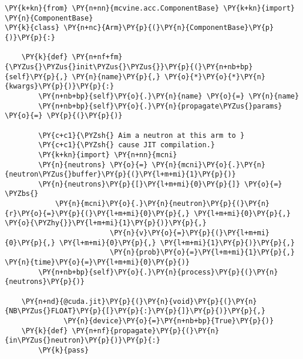 \begin{Verbatim}[commandchars=\\\{\}]
\PY{k+kn}{from} \PY{n+nn}{mcvine.acc.ComponentBase} \PY{k+kn}{import} \PY{n}{ComponentBase}
\PY{k}{class} \PY{n+nc}{Arm}\PY{p}{(}\PY{n}{ComponentBase}\PY{p}{)}\PY{p}{:}

    \PY{k}{def} \PY{n+nf+fm}{\PYZus{}\PYZus{}init\PYZus{}\PYZus{}}\PY{p}{(}\PY{n+nb+bp}{self}\PY{p}{,} \PY{n}{name}\PY{p}{,} \PY{o}{*}\PY{o}{*}\PY{n}{kwargs}\PY{p}{)}\PY{p}{:}
        \PY{n+nb+bp}{self}\PY{o}{.}\PY{n}{name} \PY{o}{=} \PY{n}{name}
        \PY{n+nb+bp}{self}\PY{o}{.}\PY{n}{propagate\PYZus{}params} \PY{o}{=} \PY{p}{(}\PY{p}{)}

        \PY{c+c1}{\PYZsh{} Aim a neutron at this arm to }
        \PY{c+c1}{\PYZsh{} cause JIT compilation.}
        \PY{k+kn}{import} \PY{n+nn}{mcni}
        \PY{n}{neutrons} \PY{o}{=} \PY{n}{mcni}\PY{o}{.}\PY{n}{neutron\PYZus{}buffer}\PY{p}{(}\PY{l+m+mi}{1}\PY{p}{)}
        \PY{n}{neutrons}\PY{p}{[}\PY{l+m+mi}{0}\PY{p}{]} \PY{o}{=} \PYZbs{}
            \PY{n}{mcni}\PY{o}{.}\PY{n}{neutron}\PY{p}{(}\PY{n}{r}\PY{o}{=}\PY{p}{(}\PY{l+m+mi}{0}\PY{p}{,} \PY{l+m+mi}{0}\PY{p}{,} \PY{o}{\PYZhy{}}\PY{l+m+mi}{1}\PY{p}{)}\PY{p}{,} 
                         \PY{n}{v}\PY{o}{=}\PY{p}{(}\PY{l+m+mi}{0}\PY{p}{,} \PY{l+m+mi}{0}\PY{p}{,} \PY{l+m+mi}{1}\PY{p}{)}\PY{p}{,} 
                         \PY{n}{prob}\PY{o}{=}\PY{l+m+mi}{1}\PY{p}{,} \PY{n}{time}\PY{o}{=}\PY{l+m+mi}{0}\PY{p}{)}
        \PY{n+nb+bp}{self}\PY{o}{.}\PY{n}{process}\PY{p}{(}\PY{n}{neutrons}\PY{p}{)}

    \PY{n+nd}{@cuda.jit}\PY{p}{(}\PY{n}{void}\PY{p}{(}\PY{n}{NB\PYZus{}FLOAT}\PY{p}{[}\PY{p}{:}\PY{p}{]}\PY{p}{)}\PY{p}{,} 
              \PY{n}{device}\PY{o}{=}\PY{n+nb+bp}{True}\PY{p}{)}
    \PY{k}{def} \PY{n+nf}{propagate}\PY{p}{(}\PY{n}{in\PYZus{}neutron}\PY{p}{)}\PY{p}{:}
        \PY{k}{pass}
\end{Verbatim}
